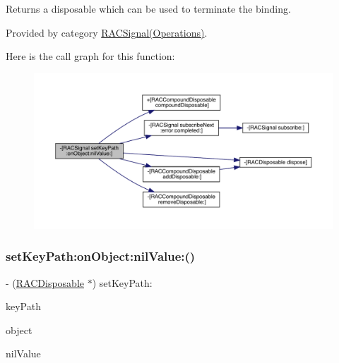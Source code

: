 Returns a disposable which can be used to terminate the binding. 

Provided by category \mbox{\hyperlink{category_r_a_c_signal_07_operations_08_a3d59cca19be3e985aa5a08cb0386faeb}{R\+A\+C\+Signal(\+Operations)}}.

Here is the call graph for this function\+:\nopagebreak
\begin{figure}[H]
\begin{center}
\leavevmode
\includegraphics[width=350pt]{interface_r_a_c_signal_a3d59cca19be3e985aa5a08cb0386faeb_cgraph}
\end{center}
\end{figure}
\mbox{\label{interface_r_a_c_signal_a3d59cca19be3e985aa5a08cb0386faeb}} 
\subsubsection{\texorpdfstring{set\+Key\+Path\+:on\+Object\+:nil\+Value\+:()}{setKeyPath:onObject:nilValue:()}\hspace{0.1cm}{\footnotesize\ttfamily [3/3]}}
{\footnotesize\ttfamily -\/ (\mbox{\hyperlink{interface_r_a_c_disposable}{R\+A\+C\+Disposable}} $\ast$) set\+Key\+Path\+: \begin{DoxyParamCaption}\item[{(N\+S\+String $\ast$)}]{key\+Path }\item[{onObject:(N\+S\+Object $\ast$)}]{object }\item[{nilValue:(id)}]{nil\+Value }\end{DoxyParamCaption}}

